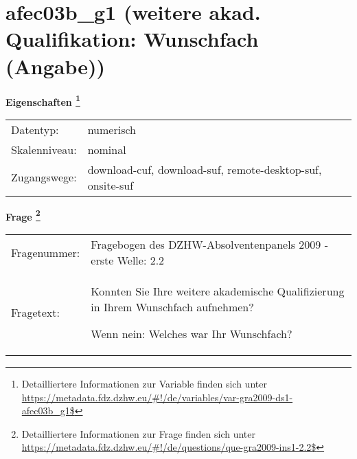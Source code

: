 
    \setcounter{footnote}{0}

    \vspace*{-1.8cm}
	\section{afec03b\_g1 (weitere akad. Qualifikation: Wunschfach (Angabe))}
	\label{section:afec03b_g1}



    \vspace*{0.5cm}
    \noindent\textbf{Eigenschaften
	\footnote{Detailliertere Informationen zur Variable finden sich unter
		\url{https://metadata.fdz.dzhw.eu/\#!/de/variables/var-gra2009-ds1-afec03b_g1$}}}\\
	\begin{tabularx}{\hsize}{@{}lX}
	Datentyp: & numerisch \\
	Skalenniveau: & nominal \\
	Zugangswege: &
	  download-cuf, 
	  download-suf, 
	  remote-desktop-suf, 
	  onsite-suf
 \\
    \end{tabularx}



				\vspace*{0.5cm}
                \noindent\textbf{Frage
	                \footnote{Detailliertere Informationen zur Frage finden sich unter
		              \url{https://metadata.fdz.dzhw.eu/\#!/de/questions/que-gra2009-ins1-2.2$}}}\\
				\begin{tabularx}{\hsize}{@{}lX}
					Fragenummer: &
					  Fragebogen des DZHW-Absolventenpanels 2009 - erste Welle:
					  2.2
 \\
					Fragetext: & Konnten Sie Ihre weitere akademische Qualifizierung in Ihrem Wunschfach aufnehmen?\par  Wenn nein: Welches war Ihr Wunschfach? \\
				\end{tabularx}





